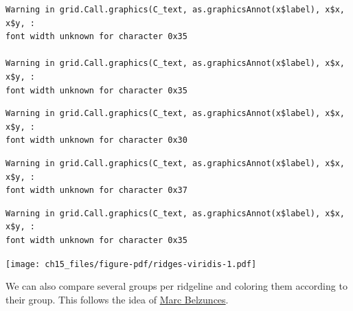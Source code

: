 \documentclass[
  letterpaper,
  DIV=11,
  numbers=noendperiod]{scrreprt}
\begin{document}
\begin{verbatim}
Warning in grid.Call.graphics(C_text, as.graphicsAnnot(x$label), x$x, x$y, :
font width unknown for character 0x35

Warning in grid.Call.graphics(C_text, as.graphicsAnnot(x$label), x$x, x$y, :
font width unknown for character 0x35
\end{verbatim}

\begin{verbatim}
Warning in grid.Call.graphics(C_text, as.graphicsAnnot(x$label), x$x, x$y, :
font width unknown for character 0x30
\end{verbatim}

\begin{verbatim}
Warning in grid.Call.graphics(C_text, as.graphicsAnnot(x$label), x$x, x$y, :
font width unknown for character 0x37
\end{verbatim}

\begin{verbatim}
Warning in grid.Call.graphics(C_text, as.graphicsAnnot(x$label), x$x, x$y, :
font width unknown for character 0x35
\end{verbatim}

\texttt{[image: ch15\_files/figure-pdf/ridges-viridis-1.pdf]}

We can also compare several groups per ridgeline and coloring them
according to their group. This follows the idea of
\href{https://twitter.com/marcbeldata/status/888697140268204032}{Marc
Belzunces}.
\end{document}
